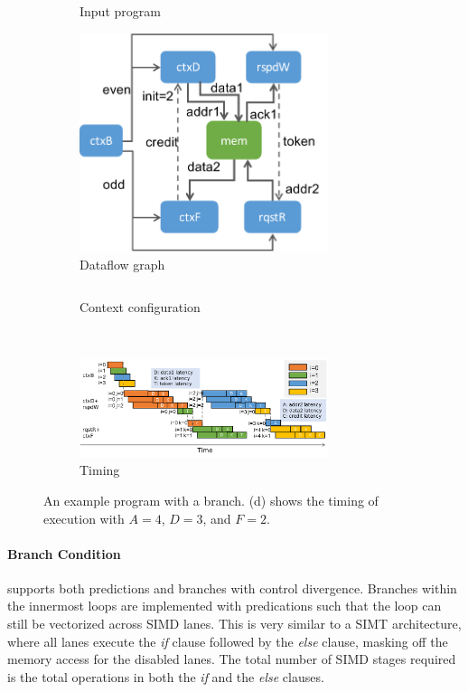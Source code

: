 \begin{figure}
\centering
  \vspace{-1cm}
\begin{subfigure}[b]{0.45\textwidth}
\inputminted{python}{code/branch.py}
\caption{Input program}
  \vspace{0.2cm}
\includegraphics[width=0.8\textwidth]{figs/branchctx.pdf}
\caption{Dataflow graph}
\end{subfigure}
\hfill
\begin{subfigure}[b]{0.48\textwidth}
\inputminted{python}{code/branchctx.py}
\caption{Context configuration}
\end{subfigure}
\\
  \vspace{0.2cm}
\begin{subfigure}[b]{\textwidth}
  \centering
\includegraphics[width=0.8\textwidth]{figs/branchtiming.pdf}
\caption{Timing}
\end{subfigure}
\caption[Branching example]{
  An example program with a branch. 
  (d) shows the timing of execution with $A=4$, $D=3$, and $F=2$.
}
\label{fig:branch} 
\end{figure}

\paragraph{Branch Condition}
\name supports both predictions and branches with control divergence.
Branches within the innermost loops are implemented with predications such that the loop can still be
vectorized across SIMD lanes.
This is very similar to a SIMT architecture, where all lanes execute the \emph{if} clause followed by the \emph{else} clause, masking off the memory access for the disabled lanes.
The total number of SIMD stages required is the total operations in both the \emph{if} and the \emph{else} clauses.


